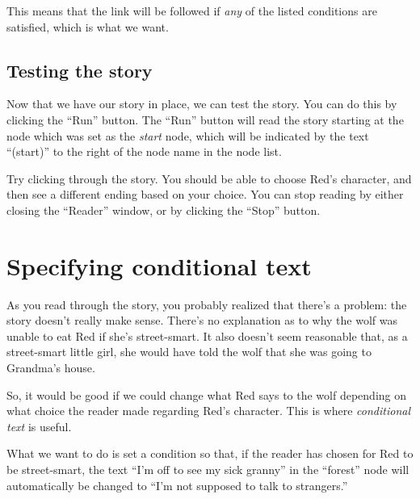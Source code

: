 \documentclass{article}
\begin{document}
This means that the link will be followed if \textit{any} of the listed
conditions are satisfied, which is what we want.

\subsection{Testing the story}

Now that we have our story in place, we can test the story. You can do this by
clicking the ``Run'' button. The ``Run'' button will read the story starting at
the node which was set as the \textit{start} node, which will be indicated by the
text ``(start)'' to the right of the node name in the node list.

Try clicking through the story. You should be able to choose Red's character, and
then see a different ending based on your choice. You can stop reading by either
closing the ``Reader'' window, or by clicking the ``Stop'' button.

\section{Specifying conditional text}

As you read through the story, you probably realized that there's a problem:
the story doesn't really make sense. There's no explanation as to why the wolf
was unable to eat Red if she's street-smart. It also doesn't seem reasonable
that, as a street-smart little girl, she would have told the wolf that she was
going to Grandma's house.

So, it would be good if we could change what Red says to the wolf depending on
what choice the reader made regarding Red's character. This is where
\textit{conditional text} is useful.

What we want to do is set a condition so that, if the reader has chosen for
Red to be street-smart, the text ``I'm off to see my sick granny'' in the
``forest'' node will automatically be changed to ``I'm not supposed to talk to
strangers.''
\end{document}
